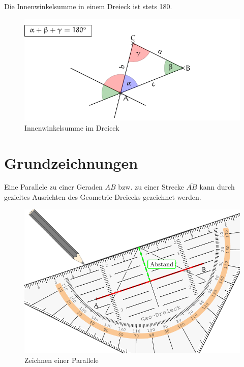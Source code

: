 \begin{satz}[Innenwinkelsumme]
 Die Innenwinkelsumme in einem Dreieck ist stets 180\degree{}.
 
 \begin{figure}  \begin{center}
               \includegraphics[]{./innenwinkel.pdf}

               \end{center}
\caption{Innenwinkelsumme im Dreieck}
\end{figure}
\end{satz}

\section{Grundzeichnungen}

\begin{regel}
Eine Parallele zu einer Geraden \(AB\) bzw. zu einer Strecke \(\overline{AB}\) kann durch gezieltes Ausrichten des Geometrie-Dreiecks gezeichnet werden.

 \begin{figure}[htp]
 \centering
 \includegraphics[width=\textwidth]{./parallele_zeichnen_pst.pdf}
 \caption{Zeichnen einer Parallele}
 \label{fig:par_zeichnen}
\end{figure}

 
\end{regel}


